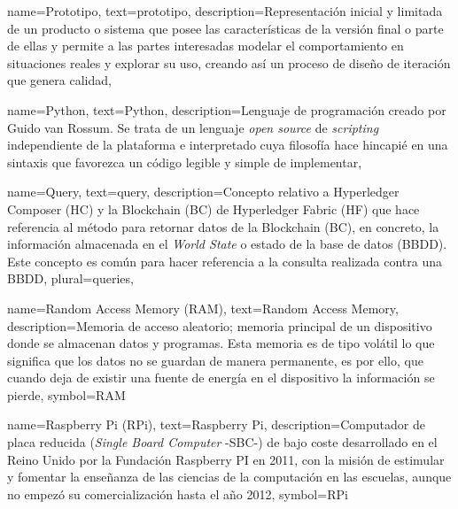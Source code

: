 {
    name={Prototipo},
    text={prototipo},
    description={Representación inicial y limitada de un producto o sistema que posee las características de la versión final o parte de ellas y permite a las partes interesadas modelar el comportamiento en situaciones reales y explorar su uso, creando así un proceso de diseño de iteración que genera calidad},
}

{
    name={Python},
    text={Python},
    description={Lenguaje de programación creado por Guido van Rossum. Se trata de un lenguaje \textit{open source} de \textit{scripting} independiente de la plataforma e interpretado cuya filosofía hace hincapié en una sintaxis que favorezca un código legible y simple de implementar},
}

{
    name={Query},
    text={query},
    description={Concepto relativo a Hyperledger Composer (HC) y la Blockchain (BC) de Hyperledger Fabric (HF) que hace referencia al método para retornar datos de la Blockchain (BC), en concreto, la información almacenada en el \textit{World State} o estado de la base de datos (BBDD). Este concepto es común para hacer referencia a la consulta realizada contra una BBDD},
    plural={queries},
}

{
    name={Random Access Memory (RAM)},
    text={Random Access Memory},
    description={Memoria de acceso aleatorio; memoria principal de un dispositivo donde se almacenan datos y programas. Esta memoria es de tipo volátil lo que significa que los datos no se guardan de manera permanente, es por ello, que cuando deja de existir una fuente de energía en el dispositivo la información se pierde},
    symbol={RAM}
}

{
    name={Raspberry Pi (RPi)},
    text={Raspberry Pi},
    description={Computador de placa reducida (\textit{Single Board Computer} -SBC-) de bajo coste desarrollado en el Reino Unido por la Fundación Raspberry PI en 2011, con la misión de estimular y fomentar la enseñanza de las ciencias de la computación en las escuelas, aunque no empezó su comercialización hasta el año 2012},
    symbol={RPi}
}

